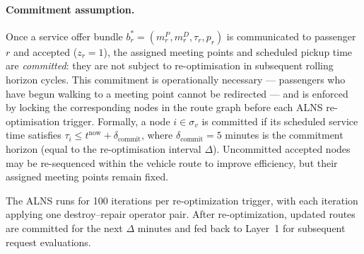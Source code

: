 \paragraph{Commitment assumption.}
Once a service offer bundle $b_r^* = (m_r^P, m_r^D, \tau_r, p_r)$ is communicated to
passenger $r$ and accepted ($z_r = 1$), the assigned meeting points and scheduled pickup
time are \emph{committed}: they are not subject to re-optimisation in subsequent rolling
horizon cycles. This commitment is operationally necessary --- passengers who have begun
walking to a meeting point cannot be redirected --- and is enforced by locking the
corresponding nodes in the route graph before each ALNS re-optimisation trigger.
Formally, a node $i \in \sigma_v$ is committed if its scheduled service time satisfies
$\tau_i \leq t^{\text{now}} + \delta_{\text{commit}}$, where $\delta_{\text{commit}} = 5$
minutes is the commitment horizon (equal to the re-optimisation interval $\Delta$).
Uncommitted accepted nodes may be re-sequenced within the vehicle route to improve
efficiency, but their assigned meeting points remain fixed.

The ALNS runs for 100 iterations per re-optimization trigger, with each
iteration applying one destroy--repair operator pair. After re-optimization, updated
routes are committed for the next $\Delta$ minutes and fed back to Layer~1 for subsequent
request evaluations.

